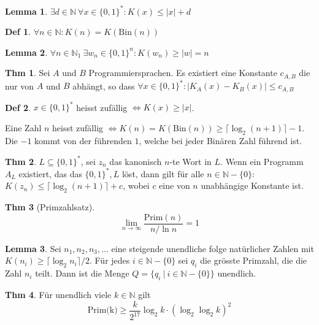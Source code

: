 \documentclass[a4paper, 10pt]{article}
\theoremstyle{definition}
\newtheorem{definition}{Def}[section]
\newtheorem{lemma}{Lemma}[section]
\newtheorem{theorem}{Thm}[section]
\newcommand{\N}{\mathbb{N}}
\begin{document}
\begin{lemma}
    \(\exists d \in \N \ \forall x \in \{0, 1\}^* : K(x) \leq |x| + d\)
\end{lemma}

\begin{definition}
    \(\forall n \in \N: K(n) = K(\text{Bin}(n))\)
\end{definition}

\begin{lemma}
    \(\forall n \in \N_1 \ \exists w_n \in \{0, 1\}^n: K(w_n) \geq |w| = n\)
\end{lemma}

\begin{theorem}
    Sei \(A\) und \(B\) Programmiersprachen. Es existiert eine Konstante \(c_{A, B}\) die nur von \(A\) und \(B\) abhängt, so dass \(\forall x \in \{0, 1\}^*: |K_A(x) - K_B(x)| \leq c_{A, B}\)
\end{theorem}

\begin{definition}
    \(x \in \{0, 1\}^*\) heisst zufällig \(\iff K(x) \geq |x|\).
    
    Eine Zahl \(n\) heisst zufällig \(\iff K(n) = K(\text{Bin}(n)) \geq \lceil \log_2(n + 1)\rceil - 1\). Die \(-1\) kommt von der führenden \(1\), welche bei jeder Binären Zahl führend ist.
\end{definition}

\begin{theorem}
    \(L \subseteq \{0, 1\}^*\), sei \(z_n\) das kanonisch \(n\)-te Wort in \(L\).  Wenn ein Programm \(A_L\) existiert, das das \(\{0, 1\}^*, L\) löst, dann gilt für alle \(n \in \N - \{0\}\): \(K(z_n) \leq \lceil \log_2(n + 1) \rceil + c\), wobei \(c\) eine von \(n\) unabhängige Konstante ist.
\end{theorem}

\begin{theorem}[Primzahlsatz]
    \[\lim_{n\to\infty} \frac{\text{Prim}(n)}{n / \ln n} = 1\]
\end{theorem}

\begin{lemma}
    Sei \(n_1, n_2, n_3, \ldots\) eine steigende unendliche folge natürlicher Zahlen mit \(K(n_i) \geq \lceil \log_2 n_i \rceil / 2\). Für jedes \(i \in \N - \{0\}\) sei \(q_i\) die grösste Primzahl, die die Zahl \(n_i\) teilt. Dann ist die Menge \(Q = \{q_i \ | \ i \in \N - \{0\}\}\) unendlich.
\end{lemma}

\begin{theorem}
    Für unendlich viele \(k \in \N\) gilt
    \[\text{Prim(k)} \geq \frac{k}{2^{17}} \log_2 k \cdot (\log_2\log_2k)^2\]
\end{theorem}
\end{document}

